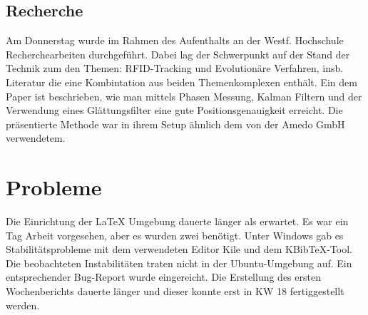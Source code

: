 \documentclass[a4paper,12pt,fleqn]{scrartcl}
\begin{document}
\subsection{Recherche}
Am Donnerstag wurde im Rahmen des Aufenthalts an der Westf. Hochschule Recherchearbeiten durchgeführt. Dabei lag der
Schwerpunkt auf der Stand der Technik zum den Themen: RFID-Tracking und Evolutionäre Verfahren, insb. Literatur die eine Kombintation aus beiden
Themenkomplexen enthält. Ein dem Paper \cite{KALMANandSMOOTHING} ist beschrieben, wie man mittels Phasen Messung, Kalman Filtern \cite{Wiki:1} und der
Verwendung eines Glättungsfilter eine gute Positionsgenauigkeit erreicht. Die präsentierte Methode war in ihrem Setup ähnlich dem von der Amedo GmbH verwendetem.

\section[Probleme]{Probleme}
Die Einrichtung der \LaTeX{} Umgebung dauerte länger als erwartet. Es war ein
Tag Arbeit vorgesehen, aber es wurden zwei benötigt.
Unter Windows gab es Stabilitätsprobleme mit dem verwendeten Editor Kile und dem KBibTeX-Tool.
Die beobachteten Instabilitäten traten nicht in der Ubuntu-Umgebung auf. Ein entsprechender Bug-Report wurde eingereicht.
Die Erstellung des ersten Wochenberichts dauerte länger und dieser konnte erst in KW 18 fertiggestellt werden.



\newpage


\end{document}
